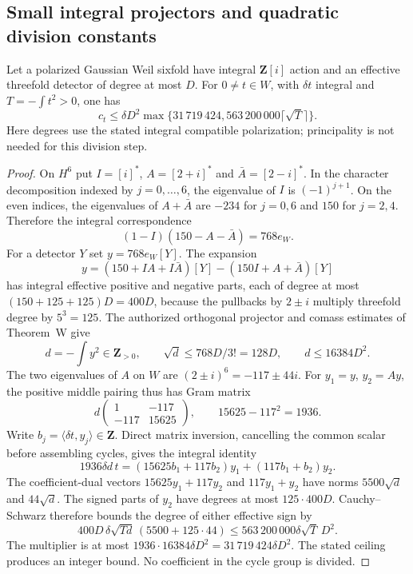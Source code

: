 \subsection{Small integral projectors and quadratic division constants}

\begin{theorem}
\label{SF-06}
Let a polarized Gaussian Weil sixfold have integral $\mathbf Z[i]$
action and an effective threefold detector of degree at most $D$.
For $0\ne t\in W$, with $\delta t$ integral and
$T=-\int t^2>0$, one has
\[
 c_t\le\delta D^2\max\{31\,719\,424,
              563\,200\,000\lceil\sqrt T\rceil\}.
\]
Here degrees use the stated integral compatible polarization;
principality is not needed for this division step.
\end{theorem}
\begin{proof}
On $H^6$ put $I=[i]^*$, $A=[2+i]^*$ and
$\bar A=[2-i]^*$. In the character decomposition indexed by
$j=0,\ldots,6$, the eigenvalue of $I$ is $(-1)^{j+1}$.
On the even indices, the eigenvalues of $A+\bar A$ are $-234$
for $j=0,6$ and $150$ for $j=2,4$. Therefore the integral
correspondence
\[
 (1-I)(150-A-\bar A)=768e_W.
\]
For a detector $Y$ set $y=768e_W[Y]$. The expansion
\[
 y=(150+IA+I\bar A)[Y]-(150I+A+\bar A)[Y]
\]
has integral effective positive and negative parts, each of degree
at most $(150+125+125)D=400D$, because the pullbacks by $2\pm i$
multiply threefold degree by $5^3=125$. The authorized orthogonal
projector and comass estimates of Theorem~W give
\[
 d=-\int y^2\in\mathbf Z_{>0},\qquad
 \sqrt d\le768D/3!=128D,\qquad d\le16384D^2.
\]
The two eigenvalues of $A$ on $W$ are
$(2\pm i)^6=-117\pm44i$. For $y_1=y$, $y_2=Ay$, the positive
middle pairing thus has Gram matrix
\[
 d\begin{pmatrix}1&-117\\-117&15625\end{pmatrix},
 \qquad 15625-117^2=1936.
\]
Write $b_j=\langle\delta t,y_j\rangle\in\mathbf Z$. Direct
matrix inversion, cancelling the common scalar before assembling
cycles, gives the integral identity
\[
 1936\delta d\,t=(15625b_1+117b_2)y_1+(117b_1+b_2)y_2.
\]
The coefficient-dual vectors $15625y_1+117y_2$ and
$117y_1+y_2$ have norms $5500\sqrt d$ and $44\sqrt d$.
The signed parts of $y_2$ have degrees at most $125\cdot400D$.
Cauchy--Schwarz therefore bounds the degree of either effective
sign by
\[
 400D\,\delta\sqrt{Td}\,(5500+125\cdot44)
 \le563\,200\,000\delta\sqrt T\,D^2.
\]
The multiplier is at most
$1936\cdot16384\delta D^2=31\,719\,424\delta D^2$.
The stated ceiling produces an integer bound. No coefficient in
the cycle group is divided.
\end{proof}

